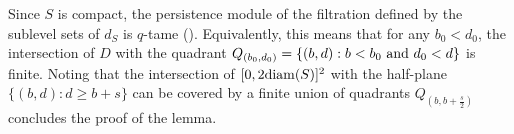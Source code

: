 \documentclass[noinfoline,preprint]{article}
\renewcommand{\1}{\mathds 1}
\begin{document}
Since $S$ is compact, the persistence module of the filtration defined by the sublevel sets of $d_S$ is $q$-tame (\cite[Corollary 3.35]{Chazal2016}). Equivalently, this means that for any $b_0 < d_0$, the intersection of $D$ with the quadrant $Q_{(b_0,d_0)} = \{ (b,d): b<b_0 \ {\rm and} \  d_0 < d \}$ is finite. 
Noting that the intersection of $[0,2{\rm diam}(S)]^2$ with the half-plane $\{ (b,d) : d \geq b + s \}$ can be covered by a finite union of quadrants $Q_{(b,b+\frac{s}{2})}$ concludes the proof of the lemma.
\end{document}
